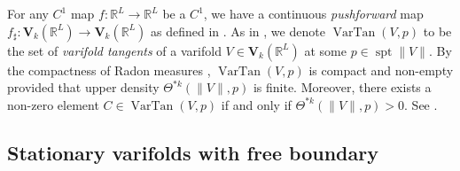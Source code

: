 \documentclass[10pt]{amsart}
\theoremstyle{definition}
\theoremstyle{remark}
\numberwithin{equation}{section}
\newcommand{\R}{\mathbb{R}}
\newcommand{\bV}{\mathbf{V}}
\newcommand{\bleta}{\boldsymbol \eta}
\newcommand{\VarTan}{\operatorname{VarTan}}
\newcommand{\spt}{\operatorname{spt}}
\begin{document}
For any $C^1$ map $f:\mathbb{R}^L \to \mathbb{R}^{L}$ be a $C^1$, we have a continuous \emph{pushforward} map $f_\sharp:\bV_k(\mathbb{R}^L) \to \bV_k(\mathbb{R}^{L})$ as defined in \cite[\S 39]{Simon}. 
As in \cite[42.3]{Simon}, we denote $\VarTan (V,p)$ to be the set of \emph{varifold tangents} of a varifold $V \in \bV_k(\R^L)$ at some $p \in \spt\|V\|$. 
By the compactness of Radon measures \cite[Theorem 4.4]{Simon}, $\VarTan(V,p)$ is compact and non-empty provided that upper density $\Theta^{*k}(\|V\|,p)$ is finite. Moreover, there exists a non-zero element $C \in \VarTan(V,p)$ if and only if $\Theta^{*k}(\|V\|,p)>0$. See \cite[3.4]{Allard72}.


\subsection{Stationary varifolds with free boundary}
\label{SS:manifolds-with-boundary}
\end{document}
